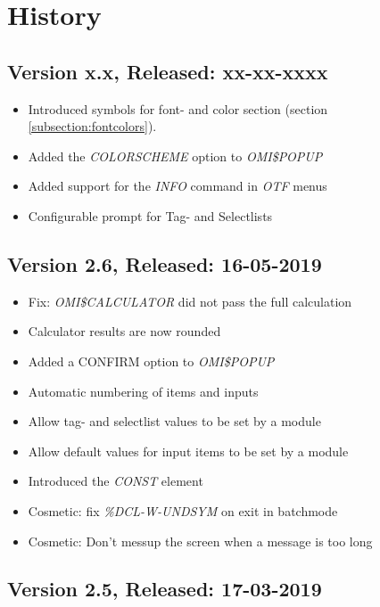 \documentclass[a4paper]{book}
\begin{document}
\chapter{History}

\section*{Version x.x, Released: xx-xx-xxxx}

\begin{itemize}
\item Introduced symbols for font- and color section (section \ref{subsection:fontcolors}).
\item Added the \textsl{COLORSCHEME} option to \textsl{OMI{\$}POPUP}
\item Added support for the \textsl{INFO} command in \textsl{OTF} menus
\item Configurable prompt for Tag- and Selectlists
\end{itemize}

\section*{Version 2.6, Released: 16-05-2019}

\begin{itemize}
\item Fix: \textsl{OMI{\$}CALCULATOR} did not pass the full calculation
\item Calculator results are now rounded
\item Added a CONFIRM option to \textsl{OMI{\$}POPUP}
\item Automatic numbering of items and inputs
\item Allow tag- and selectlist values to be set by a module
\item Allow default values for input items to be set by a module
\item Introduced the \textsl{CONST} element
\item Cosmetic: fix \textsl{\%DCL-W-UNDSYM} on exit in batchmode
\item Cosmetic: Don't messup the screen when a message is too long
\end{itemize}

\section*{Version 2.5, Released: 17-03-2019}
\end{document}
